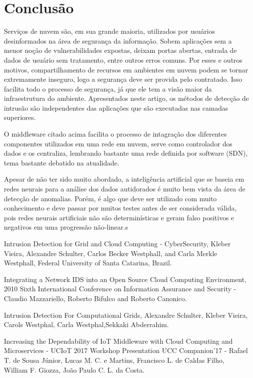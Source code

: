 \documentclass[journal]{IEEEtran}
\begin{document}
\section{Conclusão}
Serviços de nuvem são, em sua grande maioria, utilizados por usuários desinformados na área de segurança da informação. Sobem aplicações sem a menor noção de vulnerabilidades expostas, deixam portas abertas, entrada de dados de usuário sem tratamento, entre outros erros comuns. Por esses e outros motivos, compartilhamento de recursos em ambientes em nuvem podem se tornar extremamente inseguro, logo a segurança deve ser provida pelo contratado. Isso facilita todo o processo de segurança, já que ele tem a visão maior da infraestrutura do ambiente. Apresentados neste artigo, os métodos de detecção de intrusão são independentes das aplicações que são executadas nas camadas superiores. \par
O middleware citado acima facilita o processo de intagração dos diferentes componentes utilizados em uma rede em nuvem, serve como controlador dos dados e os centraliza, lembrando bastante uma rede definida por software (SDN), tema bastante debatido na atualidade. \par
Apesar de não ter sido muito abordado, a inteligência artificial que se baseia em redes neurais para a análise dos dados autidorados é muito bem vista da área de detecção de anomalias. Porém, é algo que deve ser utilizado com muito conhecimento e deve passar por muitos testes antes de ser considerada válida, pois redes neurais artificiais não são determinísticas e geram falso positivos e negativos em uma progressão não-linear.s

\begin{thebibliography}{1}

Intrusion Detection for Grid and Cloud Computing - CyberSecurity, Kleber Vieira, Alexandre Schulter, Carlos Becker Westphall, and Carla Merkle Westphall, Federal University of Santa Catarina, Brazil.

Integrating a Network IDS into an Open Source Cloud Computing Environment, 2010 Sixth International Conference on Information Assurance and Security - Claudio Mazzariello, Roberto Bifulco and Roberto Canonico.

Intrusion Detection For Computational Grids, Alexandre Schulter, Kleber Vieira, Carols Westphal, Carla Westphal,Sekkaki Abderrahim.

Increasing the Dependability of IoT Middleware with Cloud Computing and Microservices - UCIoT 2017 Workshop Presentation UCC Companion’17 - Rafael T. de Sousa Júnior, Lucas M. C. e Martins, Francisco L. de Caldas Filho, William F. Giozza, João Paulo C. L. da Costa.

\end{thebibliography}
\end{document}
